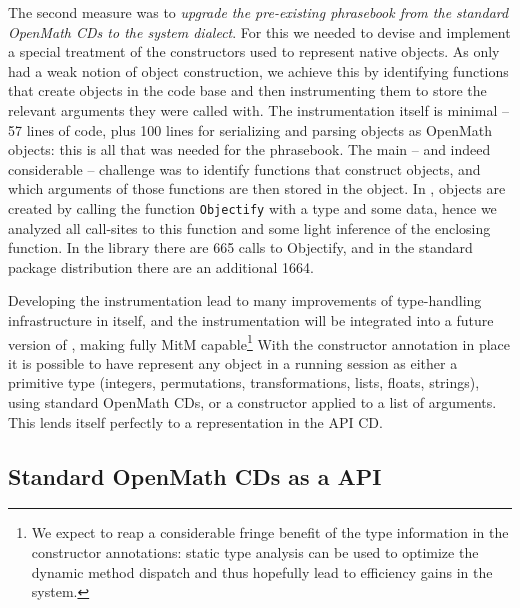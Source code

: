 The second measure was to \emph{upgrade the pre-existing \GAP phrasebook from the standard
  OpenMath CDs to the \GAP system dialect}. For this we needed to devise and implement a
special treatment of the \GAP constructors used to represent native \GAP objects. As \GAP
only had a weak notion of object construction, we achieve this by identifying functions
that create objects in the \GAP code base and then instrumenting them to store the
relevant arguments they were called with.  The instrumentation itself is minimal -- 57
lines of \GAP code, plus 100 lines for serializing and parsing \GAP objects as OpenMath
objects: this is all that was needed for the phrasebook.  The main -- and indeed
considerable -- challenge was to identify functions that construct objects, and which
arguments of those functions are then stored in the object.  In \GAP, objects are created
by calling the function \lstinline|Objectify| with a type and some data, hence we analyzed
all call-sites to this function and some light inference of the enclosing function. In the
\GAP library there are 665 calls to Objectify, and in the standard package distribution
there are an additional 1664.

Developing the instrumentation lead to many improvements of type-handling infrastructure
in \GAP itself, and the instrumentation will be integrated into a future version of \GAP,
making \GAP fully MitM capable\footnote{We expect to reap a considerable fringe benefit of
  the type information in the constructor annotations: static type analysis can be used to
  optimize the dynamic method dispatch and thus hopefully lead to efficiency gains in the
  system.}
With the constructor annotation in place it is possible to have \GAP represent
any object in a running session as either a primitive type (integers,
permutations, transformations, lists, floats, strings), using standard OpenMath
CDs, or a constructor applied to a list of arguments. This lends itself
perfectly to a representation in the \GAP API CD.

\subsection{Standard OpenMath CDs as a \Singular API}

